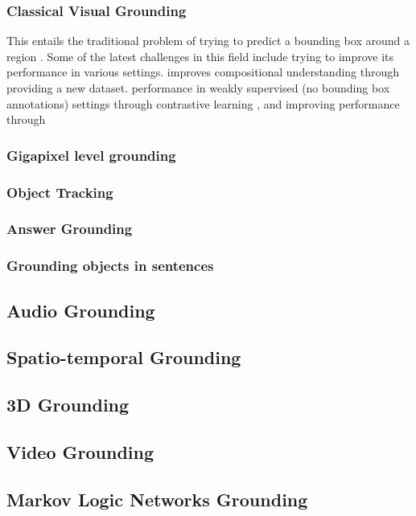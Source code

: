 \documentclass[11pt]{article}
\begin{document}
\subsubsection{Classical Visual Grounding}
This entails the traditional problem of trying to predict a bounding box around a region \cite{li-etal-2024-groundinggpt}. Some of the latest challenges in this field include trying to improve its performance in various settings. \textcite{Zeng_2024_CVPR_Comp_Challenge} improves compositional understanding through providing a new dataset. \cite{neurips_zhang_contrastive_learning}performance in weakly supervised (no bounding box annotations) settings through contrastive learning , and improving performance through

\subsubsection{Gigapixel level grounding}
\subsubsection{Object Tracking}
\cite{Zhou_2023_CVPR_Tracking}
\subsubsection{Answer Grounding}
\subsubsection{Grounding objects in sentences}

\subsection{Audio Grounding}

\subsection{Spatio-temporal Grounding}

\subsection{3D Grounding}

\subsection{Video Grounding}

\subsection{Markov Logic Networks Grounding}
\end{document}
